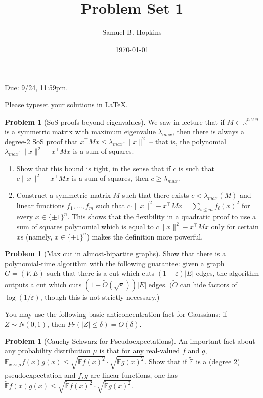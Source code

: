 \documentclass[11pt]{article}
\title{Problem Set 1}
\author{Samuel B. Hopkins}
\date{\today}
\theoremstyle{definition}
\newtheorem{problem}[theorem]{Problem}
\renewcommand{\epsilon}{\varepsilon}
\begin{document}
\maketitle

Due: 9/24, 11:59pm.

Please typeset your solutions in LaTeX.

\begin{problem}[SoS proofs beyond eigenvalues]
We saw in lecture that if $M \in \mathbb{R}^{n \times n}$ is a symmetric matrix with maximum eigenvalue $\lambda_{max}$, then there is always a degree-2 SoS proof that $x^\top M x \leq \lambda_{max} \cdot \|x\|^2$ -- that is, the polynomial $\lambda_{max} \cdot \|x\|^2 - x^\top M x$ is a sum of squares.

\begin{enumerate}
\item Show that this bound is tight, in the sense that if $c$ is such that $c \|x\|^2 - x^\top M x$ is a sum of squares, then $c \geq \lambda_{max}$.

\item Construct a symmetric matrix $M$ such that there exists $c < \lambda_{max}(M)$ and linear functions $f_1,\ldots,f_m$ such that $c \cdot \|x\|^2 - x^\top M x = \sum_{i \leq m} f_i(x)^2$ for every $x \in \{ \pm 1\}^n$. This shows that the flexibility in a quadratic proof to use a sum of squares polynomial which is equal to $c \|x\|^2 - x^\top M x$ only for certain $x$s (namely, $x \in \{\pm 1\}^n$) makes the definition more powerful.
\end{enumerate}
\end{problem}


\begin{problem}[Max cut in almost-bipartite graphs]
Show that there is a polynomial-time algorithm with the following guarantee: given a graph $G = (V,E)$ such that there is a cut which cuts $(1-\epsilon)|E|$ edges, the algorithm outputs a cut which cuts $(1-\tilde{O}(\sqrt{\epsilon}))|E|$ edges. $(\tilde{O}$ can hide factors of $\log(1/\epsilon)$, though this is not strictly necessary.)

You may use the following basic anticoncentration fact for Gaussians: if $Z \sim N(0,1)$, then $Pr(|Z| \leq \delta) = O(\delta)$.
\end{problem}

\begin{problem}[Cauchy-Schwarz for Pseudoexpectations]
An important fact about any probability distribution $\mu$ is that for any real-valued $f$ and $g$, $\mathbb{E}_{x \sim \mu} f(x) g(x) \leq \sqrt{\mathbb{E} f(x)^2} \cdot \sqrt{ \mathbb{E} g(x)^2 }$. Show that if $\tilde{\mathbb{E}}$ is a (degree 2) pseudoexpectation and $f,g$ are linear functions, one has $\tilde{\mathbb{E}} f(x) g(x) \leq \sqrt{\tilde{\mathbb{E}} f(x)^2} \cdot \sqrt{\tilde{\mathbb{E}} g(x)^2}$.
\end{problem}
\end{document}

